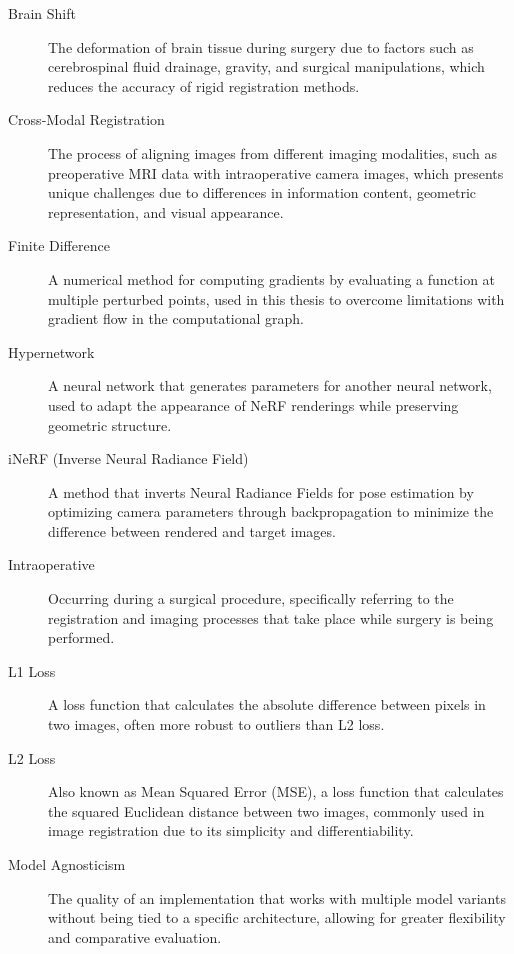 \begin{description}
    \item[Brain Shift] The deformation of brain tissue during surgery due to factors such as cerebrospinal fluid drainage, gravity, and surgical manipulations, which reduces the accuracy of rigid registration methods.
    
    \item[Cross-Modal Registration] The process of aligning images from different imaging modalities, such as preoperative MRI data with intraoperative camera images, which presents unique challenges due to differences in information content, geometric representation, and visual appearance.
    
    \item[Finite Difference] A numerical method for computing gradients by evaluating a function at multiple perturbed points, used in this thesis to overcome limitations with gradient flow in the computational graph.
    
    \item[Hypernetwork] A neural network that generates parameters for another neural network, used to adapt the appearance of NeRF renderings while preserving geometric structure.
    
    \item[iNeRF (Inverse Neural Radiance Field)] A method that inverts Neural Radiance Fields for pose estimation by optimizing camera parameters through backpropagation to minimize the difference between rendered and target images.
    
    \item[Intraoperative] Occurring during a surgical procedure, specifically referring to the registration and imaging processes that take place while surgery is being performed.
    
    \item[L1 Loss] A loss function that calculates the absolute difference between pixels in two images, often more robust to outliers than L2 loss.
    
    \item[L2 Loss] Also known as Mean Squared Error (MSE), a loss function that calculates the squared Euclidean distance between two images, commonly used in image registration due to its simplicity and differentiability.
    
    \item[Model Agnosticism] The quality of an implementation that works with multiple model variants without being tied to a specific architecture, allowing for greater flexibility and comparative evaluation.
    

\end{description}
